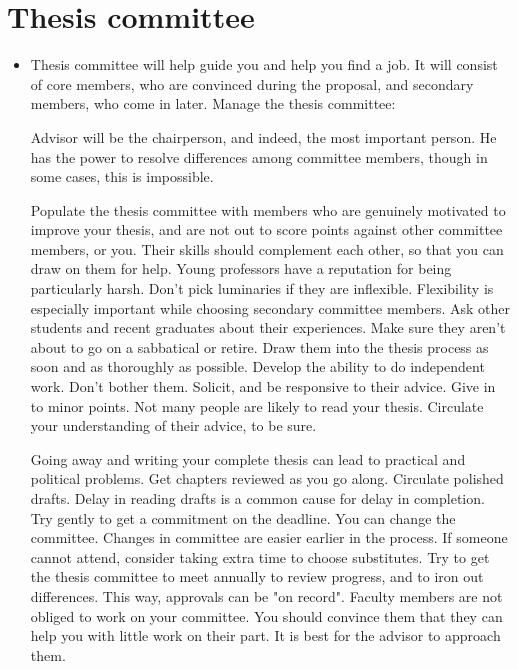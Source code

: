 \documentclass[oneside, article]{memoir}
\begin{document}
\section{Thesis committee}
\begin{itemize}
\item Thesis committee will help guide you and help you find a job. It will consist of core members, who are convinced during the proposal, and secondary members, who come in later. Manage the thesis committee:

\subitem Advisor will be the chairperson, and indeed, the most important person. He has the power to resolve differences among committee members, though in some cases, this is impossible.

\subitem Populate the thesis committee with members who are genuinely motivated to improve your thesis, and are not out to score points against other committee members, or you. 
\subsubitem Their skills should complement each other, so that you can draw on them for help. Young professors have a reputation for being particularly harsh.
\subsubitem Don't pick luminaries if they are inflexible. Flexibility is especially important while choosing secondary committee members.
\subsubitem Ask other students and recent graduates about their experiences.
\subsubitem Make sure they aren't about to go on a sabbatical or retire.
\subitem Draw them into the thesis process as soon and as thoroughly as possible.
\subitem Develop the ability to do independent work. Don't bother them.
\subitem Solicit, and be responsive to their advice. Give in to minor points. Not many people are likely to read your thesis. Circulate your understanding of their advice, to be sure.

\subsubitem Going away and writing your complete thesis can lead to practical and political problems.
\subsubitem Get chapters reviewed as you go along. Circulate polished drafts. Delay in reading drafts is a common cause for delay in completion. Try gently to get a commitment on the deadline.
\subitem You can change the committee. Changes in committee are easier earlier in the process. If someone cannot attend, consider taking extra time to choose substitutes.
\subitem Try to get the thesis committee to meet annually to review progress, and to iron out differences. This way, approvals can be "on record".
\subitem Faculty members are not obliged to work on your committee. You should convince them that they can help you with little work on their part. It is best for the advisor to approach them.
\end{itemize}
\end{document}
